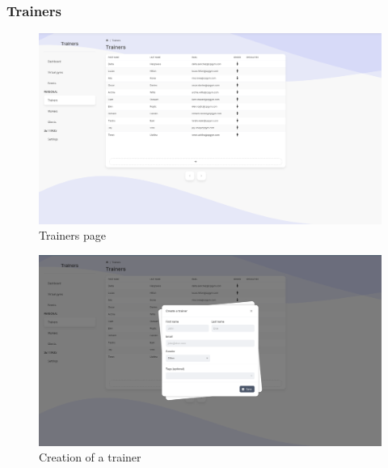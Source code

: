 \documentclass[a4paper, 12pt, oneside]{book}
\begin{document}
\subsubsection{Trainers}
\begin{figure}[H]
	\centering
	\includegraphics[width=\textwidth]{assets/core-screenshots/trainers.png}
	\caption{Trainers page}
\end{figure}
\begin{figure}[H]
	\centering
	\includegraphics[width=\textwidth]{assets/core-screenshots/create-trainer.png}
	\caption{Creation of a trainer}
\end{figure}
\end{document}
